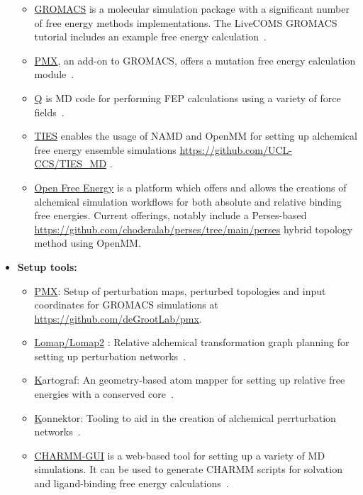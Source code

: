 \documentclass[9pt,bestpractices]{livecoms}
\begin{document}
\begin{itemize}
\begin{itemize}
	\item \href{http://www.gromacs.org/}{GROMACS} is a molecular simulation package with a significant number of free energy methods implementations. The LiveCOMS GROMACS tutorial includes an example free energy calculation~\cite{lemkul2018From}.
	\item \href{http://pmx.mpibpc.mpg.de/instructions.html}{PMX}, an add-on to GROMACS, offers a mutation free energy calculation module~\cite{abraham2015gromacs}.
	\item \href{https://github.com/qusers/Q6}{Q} is MD code for performing FEP calculations using a variety of force fields~\cite{aaquist2017q6}. 
    \item \href{http://www.ties-service.org}{TIES} enables the usage of NAMD and OpenMM for setting up alchemical free energy ensemble simulations \url{https://github.com/UCL-CCS/TIES_MD} \cite{bieniek2023}.
    \item \href{https://openfree.energy/}{Open Free Energy} is a platform which offers and allows the creations of alchemical simulation workflows for both absolute and relative binding free energies. Current offerings, notably include a Perses-based \url{https://github.com/choderalab/perses/tree/main/perses} hybrid topology method using OpenMM.
	\end{itemize}
\item[] \textbf{Setup tools:}
	\begin{itemize}
	\item \href{http://pmx.mpibpc.mpg.de/instructions.html}{PMX}: Setup of perturbation maps, perturbed topologies and input coordinates for GROMACS simulations at \url{https://github.com/deGrootLab/pmx}.
	\item \href{https://github.com/OpenFreeEnergy/Lomap}{Lomap/Lomap2} : Relative alchemical transformation graph planning for setting up perturbation networks~\cite{liu2013lead}.
        \item \href{https://github.com/OpenFreeEnergy/kartograf} 
    Kartograf: An geometry-based atom mapper for setting up relative free energies with a conserved core~\cite{ries2024kartograf}.
        \item \href{https://github.com/OpenFreeEnergy/Konnektor}
    Konnektor: Tooling to aid in the creation of alchemical perrturbation networks~\cite{}.
	\item \href{http://www.charmm-gui.org/}{CHARMM-GUI} is a web-based tool for setting up a variety of MD simulations. It can be used to generate CHARMM scripts for solvation and ligand-binding free energy calculations~\cite{jo2008charmmgui}.

\end{itemize}
\end{itemize}
\end{document}
